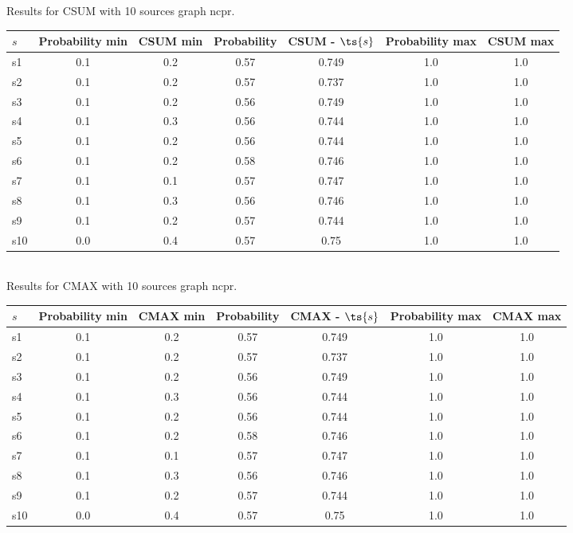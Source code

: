 \documentclass{article}
\begin{document}
\noindent Results for CSUM with 10 sources graph ncpr.

\noindent\begin{tabular}{|l|c|c|c|c|c|c|}
\hline
$s$& Probability min & CSUM min & Probability & CSUM - $\ts{s}$ & Probability max & CSUM max\\
\hline
s1 &0.1 & 0.2 & 0.57 & 0.749 & 1.0 & 1.0\\
\hline
s2 &0.1 & 0.2 & 0.57 & 0.737 & 1.0 & 1.0\\
\hline
s3 &0.1 & 0.2 & 0.56 & 0.749 & 1.0 & 1.0\\
\hline
s4 &0.1 & 0.3 & 0.56 & 0.744 & 1.0 & 1.0\\
\hline
s5 &0.1 & 0.2 & 0.56 & 0.744 & 1.0 & 1.0\\
\hline
s6 &0.1 & 0.2 & 0.58 & 0.746 & 1.0 & 1.0\\
\hline
s7 &0.1 & 0.1 & 0.57 & 0.747 & 1.0 & 1.0\\
\hline
s8 &0.1 & 0.3 & 0.56 & 0.746 & 1.0 & 1.0\\
\hline
s9 &0.1 & 0.2 & 0.57 & 0.744 & 1.0 & 1.0\\
\hline
s10 &0.0 & 0.4 & 0.57 & 0.75 & 1.0 & 1.0\\
\hline
\end{tabular}\\

\noindent Results for CMAX with 10 sources graph ncpr.

\noindent\begin{tabular}{|l|c|c|c|c|c|c|}
\hline
$s$& Probability min & CMAX min & Probability & CMAX - $\ts{s}$ & Probability max & CMAX max\\
\hline
s1 &0.1 & 0.2 & 0.57 & 0.749 & 1.0 & 1.0\\
\hline
s2 &0.1 & 0.2 & 0.57 & 0.737 & 1.0 & 1.0\\
\hline
s3 &0.1 & 0.2 & 0.56 & 0.749 & 1.0 & 1.0\\
\hline
s4 &0.1 & 0.3 & 0.56 & 0.744 & 1.0 & 1.0\\
\hline
s5 &0.1 & 0.2 & 0.56 & 0.744 & 1.0 & 1.0\\
\hline
s6 &0.1 & 0.2 & 0.58 & 0.746 & 1.0 & 1.0\\
\hline
s7 &0.1 & 0.1 & 0.57 & 0.747 & 1.0 & 1.0\\
\hline
s8 &0.1 & 0.3 & 0.56 & 0.746 & 1.0 & 1.0\\
\hline
s9 &0.1 & 0.2 & 0.57 & 0.744 & 1.0 & 1.0\\
\hline
s10 &0.0 & 0.4 & 0.57 & 0.75 & 1.0 & 1.0\\
\hline
\end{tabular}\\
\end{document}
